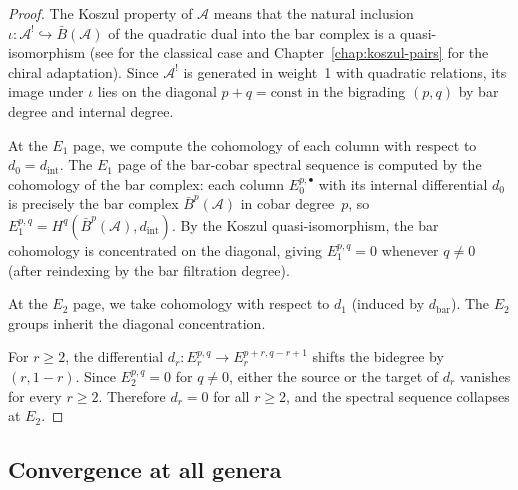 \begin{proof}
The Koszul property of $\mathcal{A}$ means that the natural inclusion $\iota: \mathcal{A}^! \hookrightarrow \bar{B}(\mathcal{A})$ of the quadratic dual into the bar complex is a quasi-isomorphism (see \cite[Theorem~3.4.1]{LV12} for the classical case and Chapter~\ref{chap:koszul-pairs} for the chiral adaptation). Since $\mathcal{A}^!$ is generated in weight~1 with quadratic relations, its image under $\iota$ lies on the diagonal $p + q = \text{const}$ in the bigrading $(p,q)$ by bar degree and internal degree.

At the $E_1$ page, we compute the cohomology of each column with respect to $d_0 = d_{\text{int}}$. The $E_1$ page of the bar-cobar spectral sequence is computed by the cohomology of the bar complex: each column $E_0^{p,\bullet}$ with its internal differential $d_0$ is precisely the bar complex $\bar{B}^p(\mathcal{A})$ in cobar degree~$p$, so $E_1^{p,q} = H^q(\bar{B}^p(\mathcal{A}), d_{\mathrm{int}})$. By the Koszul quasi-isomorphism, the bar cohomology is concentrated on the diagonal, giving $E_1^{p,q} = 0$ whenever $q \neq 0$ (after reindexing by the bar filtration degree).

At the $E_2$ page, we take cohomology with respect to $d_1$ (induced by $d_{\text{bar}}$). The $E_2$ groups inherit the diagonal concentration.

For $r \geq 2$, the differential $d_r: E_r^{p,q} \to E_r^{p+r, q-r+1}$ shifts the bidegree by $(r, 1-r)$. Since $E_2^{p,q} = 0$ for $q \neq 0$, either the source or the target of $d_r$ vanishes for every $r \geq 2$. Therefore $d_r = 0$ for all $r \geq 2$, and the spectral sequence collapses at $E_2$.
\end{proof}

\subsection{Convergence at all genera}

